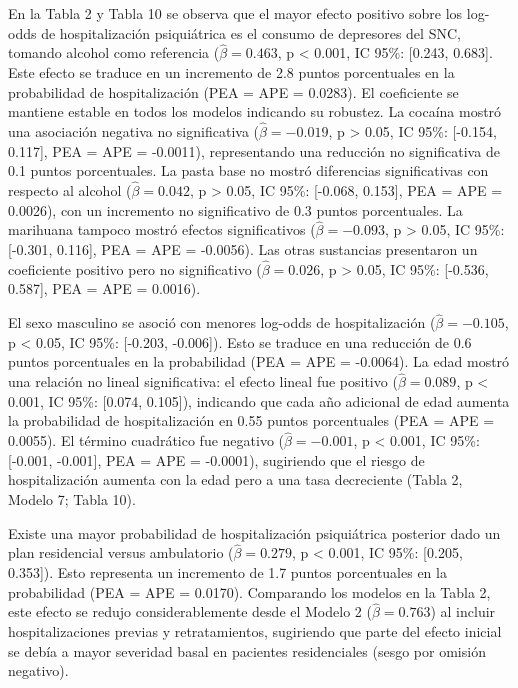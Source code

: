 \documentclass[
  spanish,
  10pt,
]{article}
\begin{document}
En la Tabla 2 y Tabla 10 se observa que el mayor efecto positivo sobre
los log-odds de hospitalización psiquiátrica es el consumo de depresores
del SNC, tomando alcohol como referencia (\(\hat{\beta} = 0.463\), p
\textless{} 0.001, IC 95\%: {[}0.243, 0.683{]}. Este efecto se traduce
en un incremento de 2.8 puntos porcentuales en la probabilidad de
hospitalización (PEA = APE = 0.0283). El coeficiente se mantiene estable
en todos los modelos indicando su robustez. La cocaína mostró una
asociación negativa no significativa (\(\hat{\beta} = -0.019\), p
\textgreater{} 0.05, IC 95\%: {[}-0.154, 0.117{]}, PEA = APE = -0.0011),
representando una reducción no significativa de 0.1 puntos porcentuales.
La pasta base no mostró diferencias significativas con respecto al
alcohol (\(\hat{\beta} = 0.042\), p \textgreater{} 0.05, IC 95\%:
{[}-0.068, 0.153{]}, PEA = APE = 0.0026), con un incremento no
significativo de 0.3 puntos porcentuales. La marihuana tampoco mostró
efectos significativos (\(\hat{\beta} = -0.093\), p \textgreater{} 0.05,
IC 95\%: {[}-0.301, 0.116{]}, PEA = APE = -0.0056). Las otras sustancias
presentaron un coeficiente positivo pero no significativo
(\(\hat{\beta} = 0.026\), p \textgreater{} 0.05, IC 95\%: {[}-0.536,
0.587{]}, PEA = APE = 0.0016).

El sexo masculino se asoció con menores log-odds de hospitalización
(\(\hat{\beta} = -0.105\), p \textless{} 0.05, IC 95\%: {[}-0.203,
-0.006{]}). Esto se traduce en una reducción de 0.6 puntos porcentuales
en la probabilidad (PEA = APE = -0.0064). La edad mostró una relación no
lineal significativa: el efecto lineal fue positivo
(\(\hat{\beta} = 0.089\), p \textless{} 0.001, IC 95\%: {[}0.074,
0.105{]}), indicando que cada año adicional de edad aumenta la
probabilidad de hospitalización en 0.55 puntos porcentuales (PEA = APE =
0.0055). El término cuadrático fue negativo (\(\hat{\beta} = -0.001\), p
\textless{} 0.001, IC 95\%: {[}-0.001, -0.001{]}, PEA = APE = -0.0001),
sugiriendo que el riesgo de hospitalización aumenta con la edad pero a
una tasa decreciente (Tabla 2, Modelo 7; Tabla 10).

Existe una mayor probabilidad de hospitalización psiquiátrica posterior
dado un plan residencial versus ambulatorio (\(\hat{\beta} = 0.279\), p
\textless{} 0.001, IC 95\%: {[}0.205, 0.353{]}). Esto representa un
incremento de 1.7 puntos porcentuales en la probabilidad (PEA = APE =
0.0170). Comparando los modelos en la Tabla 2, este efecto se redujo
considerablemente desde el Modelo 2 (\(\hat{\beta} = 0.763\)) al incluir
hospitalizaciones previas y retratamientos, sugiriendo que parte del
efecto inicial se debía a mayor severidad basal en pacientes
residenciales (sesgo por omisión negativo).
\end{document}
